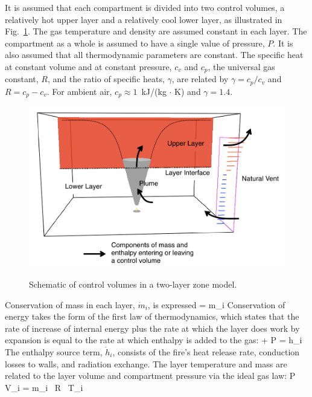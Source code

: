  It is assumed that each compartment is divided into two control volumes, a relatively hot upper layer and a relatively cool lower layer, as illustrated in Fig.~\ref{fig:Control_Volumes}. The gas temperature and density are assumed constant in each layer. The compartment as a whole is assumed to have a single value of pressure, $P$. It is also assumed that all thermodynamic parameters are constant. The specific heat at constant volume and at constant pressure, $c_v$ and $c_p$, the universal gas constant, $R$, and the ratio of specific heats, $\gamma$, are related by $\gamma = c_p / c_v$ and $R = c_p- c_v$.  For ambient air, $c_p \approx 1$~kJ/(kg $\cdot$ K) and $\gamma = 1.4$.
\begin{figure}[h]
\begin{center}
\includegraphics[width=\textwidth]{FIGURES/Theory/Control_Volumes}\\
\end{center}
\caption{Schematic of control volumes in a two-layer zone model.}
 \label{fig:Control_Volumes}
\end{figure}
Conservation of mass in each layer, $\dot m_i$, is expressed
\be
    = \dot m_i  \label{mass_con}
\ee
Conservation of energy takes the form of the first law of thermodynamics, which states that the rate of increase of internal energy plus the rate at which the layer does work by expansion is equal to the rate at which enthalpy is added to the gas:
\be
    +  P  =  \dot h_i \label{eq:first_law}
\ee
The enthalpy source term, $\dot h_i$, consists of the fire's heat release rate, conduction losses to walls, and radiation exchange. The layer temperature and mass are related to the layer volume and compartment pressure via the ideal gas law:
\be
  P \, V_i = m_i \, R \, T_i \label{EoS}
